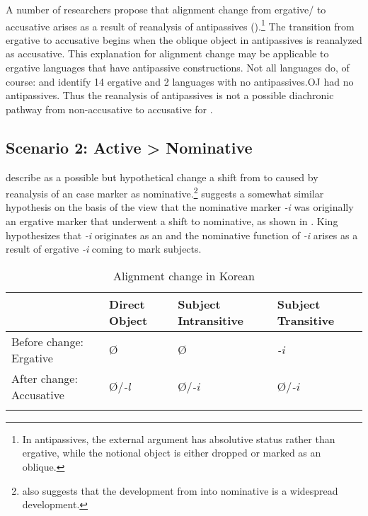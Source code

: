 \documentclass[output=paper]{LSP/langsci}
\begin{document}
A number of researchers propose that alignment change from ergative/ to accusative arises as a result of reanalysis of antipassives (\cf \citealt{Harrisetal1995Historical,Bittneretal1996Structural,Aldridge2012Antipassive}).\footnote{In antipassives, the external argument has absolutive status rather than ergative, while the notional object is either dropped or marked as an oblique.} The transition from ergative to accusative begins when the oblique object in antipassives is reanalyzed as accusative. This explanation for alignment change may be applicable to ergative languages that have antipassive constructions. Not all languages do, of course: \citet{Polinsky2013Antipassive} and \citet{Comrie2013Alignment} identify 14 ergative and 2  languages with no antipassives.OJ  had no antipassives. Thus the reanalysis of antipassives is not a possible diachronic pathway from non-accusative to accusative for .

\subsection{Scenario 2: Active > Nominative}\label{14-ya-sec:4.2}

\citet[258]{Harrisetal1995Historical} describe as a possible but hypothetical change a shift from  to  caused by reanalysis of an  case marker as nominative.\footnote{\citet{Klimov1974Character,Klimov1977Tipologija} also suggests that the development from  into nominative is a widespread development.} \citet{King1988Korean} suggests a somewhat similar hypothesis on the basis of the view that the  nominative marker \textit{-i} was originally an ergative marker that underwent a shift to nominative, as shown in . King hypothesizes that \textit{-i} originates as an  and the nominative function of \textit{-i} arises as a result of ergative \textit{-i} coming to mark  subjects.


\begin{table}
\caption{Alignment change in Korean \citep{King1988Korean}}
\label{14-ya-tab:4}

\begin{tabularx}{\textwidth}{lQQQ}
\lsptoprule
& Direct Object & Subject Intransitive & Subject
Transitive\\
\midrule
Before change: Ergative & Ø & Ø & \textit{-i}\\
After change: Accusative & Ø/\textit{-l} & Ø/\textit{-i} & Ø/\textit{-i}\\
\lspbottomrule
\end{tabularx}
\end{table}
\end{document}
